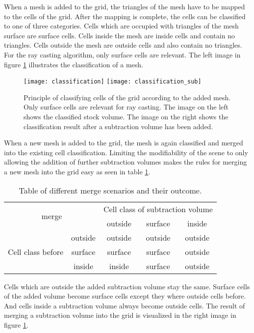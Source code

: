 When a mesh is added to the grid, the triangles of the mesh have to be mapped to the cells of the grid. After the mapping is complete, the cells can be classified to one of three categories. Cells which are occupied with triangles of the mesh surface are surface cells. Cells inside the mesh are inside cells and contain no triangles. Cells outside the mesh are outside cells and also contain no triangles. For the ray casting algorithm, only surface cells are relevant. The left image in figure \ref{fig:classification} illustrates the classification of a mesh.

\begin{figure}
\centering
\texttt{[image: classification]}
\texttt{[image: classification\_sub]}
\caption{Principle of classifying cells of the grid according to the added mesh. Only surface cells are relevant for ray casting. The image on the left shows the classified stock volume. The image on the right shows the classification result after a subtraction volume has been added.}
\label{fig:classification}
\end{figure}

When a new mesh is added to the grid, the mesh is again classified and merged into the existing cell classification. Limiting the modifiability of the scene to only allowing the addition of further subtraction volumes makes the rules for merging a new mesh into the grid easy as seen in table \ref{tbl:classification_rules}.

\begin{table}[h]
\centering
\begin{tabular}{|c|c|c|c|c|}
\hline
\multicolumn{2}{|c|}{\multirow{2}{*}{merge}} & \multicolumn{3}{c|}{Cell class of subtraction volume} \\
\cline{3-5}
\multicolumn{2}{|c|}{} & outside & surface & inside \\
 \hline
\multirow{3}{*}{Cell class before} & outside & outside & outside & outside \\
\cline{2-5}
 & surface & surface & surface & outside \\
\cline{2-5}
 & inside & inside & surface & outside \\
\hline
\end{tabular}
\caption{Table of different merge scenarios and their outcome.}
\label{tbl:classification_rules}
\end{table}

Cells which are outside the added subtraction volume stay the same. Surface cells of the added volume become surface cells except they where outside cells before. And cells inside a subtraction volume always become outside cells. The result of merging a subtraction volume into the grid is visualized in the right image in figure \ref{fig:classification}.

